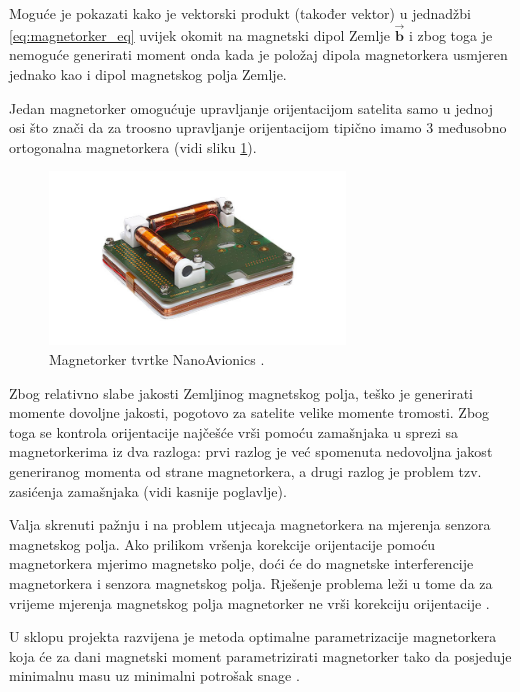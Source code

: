 \documentclass[times, utf8, diplomski, numeric]{templates/template}
\begin{document}
{{{{                Moguće je pokazati kako je vektorski produkt (također vektor) u jednadžbi \ref{eq:magnetorker_eq} uvijek okomit na magnetski dipol Zemlje $\overrightarrow{\boldsymbol{b}}$ i zbog toga je nemoguće generirati moment onda kada je položaj dipola magnetorkera usmjeren jednako kao i dipol magnetskog polja Zemlje.

                Jedan magnetorker omogućuje upravljanje orijentacijom satelita samo u jednoj osi što znači da za troosno upravljanje orijentacijom tipično imamo 3 međusobno ortogonalna magnetorkera (vidi sliku \ref{fig:magnetorquer_img}).

                \begin{figure}[htb]
                \centering
                \includegraphics[width=0.7\textwidth]{images/magnetorquer_img.jpg}
                \caption{Magnetorker tvrtke NanoAvionics \cite{magnetorquer_cite}.}
                \label{fig:magnetorquer_img}
                \end{figure}

                Zbog relativno slabe jakosti Zemljinog magnetskog polja, teško je generirati momente dovoljne jakosti, pogotovo za satelite velike momente tromosti. Zbog toga se kontrola orijentacije najčešće vrši pomoću zamašnjaka u sprezi sa magnetorkerima iz dva razloga: prvi razlog je već spomenuta nedovoljna jakost generiranog momenta od strane magnetorkera, a drugi razlog je problem tzv. zasićenja zamašnjaka (vidi kasnije poglavlje).

                Valja skrenuti pažnju i na problem utjecaja magnetorkera na mjerenja senzora magnetskog polja. Ako prilikom vršenja korekcije orijentacije pomoću magnetorkera mjerimo magnetsko polje, doći će do magnetske interferencije magnetorkera i senzora magnetskog polja. Rješenje problema leži u tome da za vrijeme mjerenja magnetskog polja magnetorker ne vrši korekciju orijentacije \cite{adcsKnjiga}.

                U sklopu projekta razvijena je metoda optimalne parametrizacije magnetorkera koja će za dani magnetski moment parametrizirati magnetorker tako da posjeduje minimalnu masu uz minimalni potrošak snage \cite{magnetorker_ieee}.
            }

}}}
\end{document}
